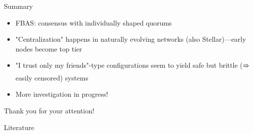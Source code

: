 \documentclass{beamer}
\newcommand{\Arrow}[1][]{$\xRightarrow{\text{#1}}$ }
\begin{document}

\begin{frame}{Summary}
  \begin{itemize}
    \item FBAS: consensus with \alert{individually shaped quorums}
    \item "Centralization" happens in naturally evolving networks (also Stellar)---\alert{early nodes become top tier}
    \item "I trust only my friends"-type configurations seem to yield \alert{safe but brittle} (\Arrow easily censored) systems
    \item More investigation in progress!
  \end{itemize}
  \vfill
  \centering
  \alert{Thank you for your attention!}
\end{frame}

\begin{frame}{Literature}
  \tiny
  
  
\end{frame}
\end{document}
